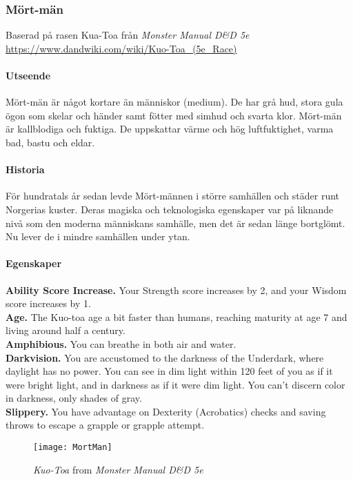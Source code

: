 \subsubsection{Mört-män}
\label{mortman}
Baserad på rasen Kua-Toa från \textit{Monster Manual D\&D 5e\cite{MonsterManual}} \\
\url{https://www.dandwiki.com/wiki/Kuo-Toa_(5e_Race)}
%
\paragraph{Utseende}
Mört-män är något kortare än människor (medium). De har grå hud, stora gula ögon som skelar och händer samt fötter med simhud och svarta klor. Mört-män är kallblodiga och fuktiga. De uppskattar värme och hög luftfuktighet, varma bad, bastu och eldar.
%
\paragraph{Historia}
För hundratals år sedan levde Mört-männen i större samhällen och städer runt Norgerias kuster. Deras magiska och teknologiska egenskaper var på liknande nivå som den moderna människans samhälle, men det är sedan länge bortglömt. Nu lever de i mindre samhällen under ytan.
%
\paragraph{Egenskaper}
\textbf{Ability Score Increase.} Your Strength score increases by 2, and your Wisdom score increases by 1. \\
\textbf{Age.} The Kuo-toa age a bit faster than humans, reaching maturity at age 7 and living around half a century. \\
\textbf{Amphibious.} You can breathe in both air and water. \\
\textbf{Darkvision.} You are accustomed to the darkness of the Underdark, where daylight has no power. You can see in dim light within 120 feet of you as if it were bright light, and in darkness 
as if it were dim light. You can't discern color in darkness, only shades of gray. \\
\textbf{Slippery.} You have advantage on Dexterity (Acrobatics) checks and saving throws to escape a grapple or grapple attempt. \\

\begin{figure}
	\centering
	\texttt{[image: MortMan]}
	\caption{\textit{Kuo-Toa} from \textit{Monster Manual D\&D 5e}\cite{MonsterManual}}
\end{figure}